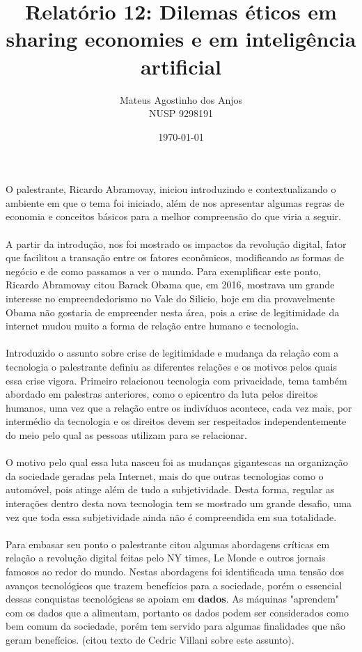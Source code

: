 \documentclass[12pt]{article}
\title{Relatório 12: Dilemas éticos em sharing economies e em inteligência artificial}
\author{Mateus Agostinho dos Anjos\\NUSP 9298191}
\date{\today}
\begin{document}
	\maketitle
	\paragraph{}
		O palestrante, Ricardo Abramovay, iniciou introduzindo e contextualizando
		o ambiente em que o tema foi iniciado, além de nos apresentar algumas
		regras de economia e conceitos básicos para a melhor compreensão
		do que viria a seguir.
	\paragraph{}
		A partir da introdução, nos foi mostrado os impactos da revolução digital,
		fator que facilitou a transação entre os fatores econômicos, modificando
		as formas de negócio e de como passamos a ver o mundo. Para exemplificar
		este ponto, Ricardo Abramovay citou Barack Obama que, em 2016, 
		mostrava um grande interesse no empreendedorismo no Vale do Silicio,
		hoje em dia provavelmente Obama não gostaria de empreender nesta área, 
		pois a crise de legitimidade da internet mudou muito a forma de relação
		entre humano e tecnologia.
	\paragraph{}
		Introduzido o assunto sobre crise de legitimidade e mudança da relação
		com a tecnologia o palestrante definiu as diferentes relações e os
		motivos pelos quais essa crise vigora. Primeiro relacionou tecnologia com
		privacidade, tema também abordado em palestras anteriores, como
		o epicentro da luta pelos direitos humanos, uma vez que a relação entre
		os indivíduos acontece, cada vez mais, por intermédio da tecnologia e
		os direitos devem ser respeitados independentemente do meio pelo qual
		as pessoas utilizam para se relacionar.
	\paragraph{}
		O motivo pelo qual essa luta nasceu foi as mudanças gigantescas na 
		organização da sociedade geradas pela Internet, mais do que outras
		tecnologias como o automóvel, pois atinge além de tudo a subjetividade.
		Desta forma, regular as interações dentro desta nova tecnologia tem
		se mostrado um grande desafio, uma vez que toda essa subjetividade
		ainda não é compreendida em sua totalidade.
	\paragraph{}
		Para embasar seu ponto o palestrante citou algumas abordagens críticas
		em relação a revolução digital feitas pelo NY times, Le Monde e outros
		jornais famosos ao redor do mundo. Nestas abordagens foi identificada
		uma tensão dos avanços tecnológicos que trazem benefícios para a sociedade, 
		porém o essencial dessas conquistas tecnológicas se apoiam em 
		\textbf{dados}. As máquinas "aprendem" com os dados que a alimentam,
		portanto os dados podem ser considerados como bem comum da sociedade, 
		porém tem servido para algumas finalidades que não geram benefícios. (citou
		texto de Cedric Villani sobre este assunto).
\end{document}
